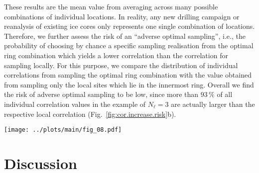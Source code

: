 \documentclass[cp, manuscript]{copernicus}
\begin{document}
These results are the mean value from averaging across many possible
combinations of individual locations. In reality, any new drilling campaign or
reanalysis of existing ice cores only represents one single combination of
locations. Therefore, we further assess the risk of an ``adverse optimal
sampling'', i.e., the probability of choosing by chance a specific sampling
realisation from the optimal ring combination which yields a lower correlation
than the correlation for sampling locally. For this purpose, we compare the
distribution of individual correlations from sampling the optimal ring
combination with the value obtained from sampling only the local sites which lie
in the innermost ring. Overall we find the risk of adverse optimal sampling to
be low, since more than $93\,\%$ of all individual correlation values in the
example of $N_{\ell}=3$ are actually larger than the respective local
correlation (Fig.~\ref{fig:cor.increase.risk}b).

\begin{figure*}[t]%
\centering
\texttt{[image: ../plots/main/fig\_08.pdf]}
\caption{%
  Gain in correlation and risk of adverse sampling. (\textbf{a}) The average
  correlation with the target temperature at the EDML (red) and Vostok (blue)
  sites depending on the number of locations, $N_{\ell}$, used for averaging the
  $\delta^{18}\mathrm{O}^{\mathrm{(pw)}}$ time series. Sampling is performed
  either locally from the innermost ring only (dashed lines), or from all
  possible individual combinations of locations for the respective optimal ring
  combination determined for each $N_{\ell}$ (solid lines). Compared to the local
  samples which show virtually no or only a small increase with the number of
  sampled locations, the correlation increases markedly with $N_{\ell}$ when
  sampling from the optimal rings, as highlighted by the shaded
  area. (\textbf{b}) Histogram of individual correlations for sampling from the
  optimal ring combination when averaging $N_{\ell}=3$ locations compared to the
  correlation (vertical lines) for sampling from the innermost ring only,
  displayed for the EDML (red) and Vostok (blue) target sites. In both cases,
  the correlation is higher than the local value for more than $93\,\%$ of the
  optimal ring combination samples.}
\label{fig:cor.increase.risk}%
\end{figure*}%

\section{Discussion}\label{discussion}
\end{document}
